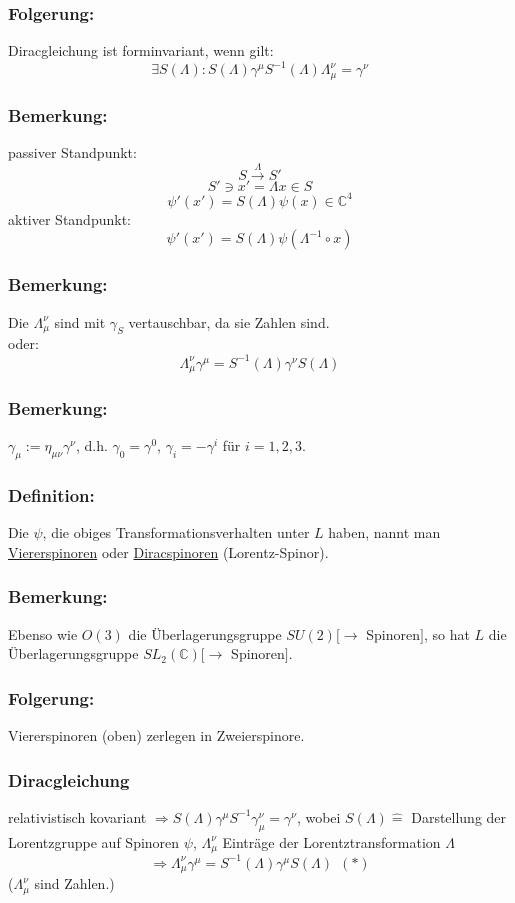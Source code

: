 \documentclass[twoside,a4paper]{scrartcl}
\newcommand{\C}{\mathbb{C}}
\renewcommand{\1}{\mathds{1}}
\newcommand{\Ra}{\Rightarrow}
\newcommand{\ra}{\rightarrow}
\newcommand{\entspricht}{\mathrel{\widehat{=}}}
\renewcommand{\L}{\Lambda}
\renewcommand{\C}{\mathbb{C}}
\begin{document}
\subsubsection*{Folgerung:}
Diracgleichung ist forminvariant, wenn gilt:
$$\exists S(\L): S(\L) \gamma^\mu S^{-1}(\L) \L_\mu^\nu=\gamma^\nu$$
\subsubsection*{Bemerkung:}
passiver Standpunkt:
$$S \stackrel{\L}{\ra} S' $$
$$S' \ni x'=\L x \in S$$
$$\psi'(x')=S(\L) \psi(x) \in \C^4$$
aktiver Standpunkt:
$$\psi'(x')=S(\L)\psi(\L^{-1} \circ x)$$
\subsubsection*{Bemerkung:}
Die $\L_\mu^\nu$ sind mit $\gamma_S$ vertauschbar, da sie Zahlen sind.\\
oder: $$\L_\mu^\nu \gamma^\mu=S^{-1}(\L)\gamma^\nu S(\L)$$
\subsubsection*{Bemerkung:}
$\gamma_\mu:=\eta_{\mu\nu}\gamma^\nu$, d.h. $\gamma_0=\gamma^0$, $\gamma_i=-\gamma^i$ für $i=1,2,3$.
\subsubsection*{Definition:}
Die $\psi$, die obiges Transformationsverhalten unter $L$ haben, nannt man \underline{Viererspinoren} oder \underline{Diracspinoren} (Lorentz-Spinor).
\subsubsection*{Bemerkung:}
Ebenso wie $O(3)$ die Überlagerungsgruppe $SU(2)[\ra$ Spinoren$]$, so hat $L$ die Überlagerungsgruppe $SL_2(\C)[\ra$ Spinoren$]$.
\subsubsection*{Folgerung:}
Viererspinoren (oben) zerlegen in Zweierspinore.


% 
\subsubsection*{Diracgleichung}
relativistisch kovariant $\Ra S(\L) \gamma^\mu S^{-1} \gamma_\mu^\nu=\gamma^\nu$, wobei $S(\L) \entspricht$ Darstellung der Lorentzgruppe auf Spinoren $\psi$, $\L^\nu_\mu$ Einträge der Lorentztransformation $\L$
$$\Ra \L^\nu_\mu\gamma^\mu=S^{-1}(\L) \gamma^\mu S(\L) \ \ (*)$$ 
($\L^\nu_\mu$ sind Zahlen.)
\end{document}

